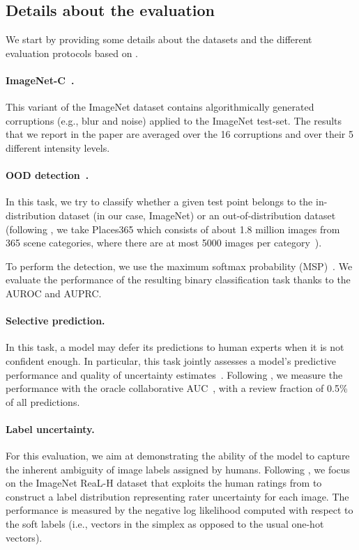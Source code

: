 \documentclass{article}
\begin{document}
\subsection{Details about the evaluation}

We start by providing some details about the datasets and the different evaluation protocols based on \citet{djolonga2020robustness}.

\paragraph{ImageNet-C~\citep{hendrycks2019benchmarking}.} This variant of the ImageNet dataset contains algorithmically generated corruptions (e.g., blur and noise) applied to the ImageNet test-set. The results that we report in the paper are averaged over the 16 corruptions and over their 5 different intensity levels.

\paragraph{OOD detection~\citep{hendrycks2019scaling,fort2021exploring}.} In this task, we try to classify whether a given test point belongs to the in-distribution dataset (in our case, ImageNet) or an out-of-distribution dataset (following \citet{hendrycks2019scaling, tran2022plex}, we take Places365 which consists of about 1.8 million images from 365 scene categories, where there are at most 5000 images per category~\citep{zhou2017places}).

To perform the detection, we use the maximum softmax probability (MSP)~\citep{hendrycks2019scaling, tran2022plex}. We evaluate the performance of the resulting binary classification task thanks to the AUROC and AUPRC.

\paragraph{Selective prediction.}
In this task, a model may defer its predictions to human experts when it is not confident enough.
In particular, this task jointly assesses a model’s predictive performance and quality of
uncertainty estimates~\citep{el2010foundations}. 
Following \citet{tran2022plex}, we measure the performance with the oracle collaborative AUC~\citep{kivlichan2021measuring}, with a review fraction of 0.5\% of all predictions.

\paragraph{Label uncertainty.} For this evaluation, we aim at demonstrating the ability of the model to capture the inherent ambiguity of image labels assigned by humans. Following \citet{tran2022plex}, we focus on the ImageNet ReaL-H dataset that exploits the human ratings from \citet{beyer2020we} to construct a label
distribution representing rater uncertainty for each image. The performance is measured by the negative log likelihood computed with respect to the soft labels (i.e., vectors in the simplex as opposed to the usual one-hot vectors).
\end{document}
